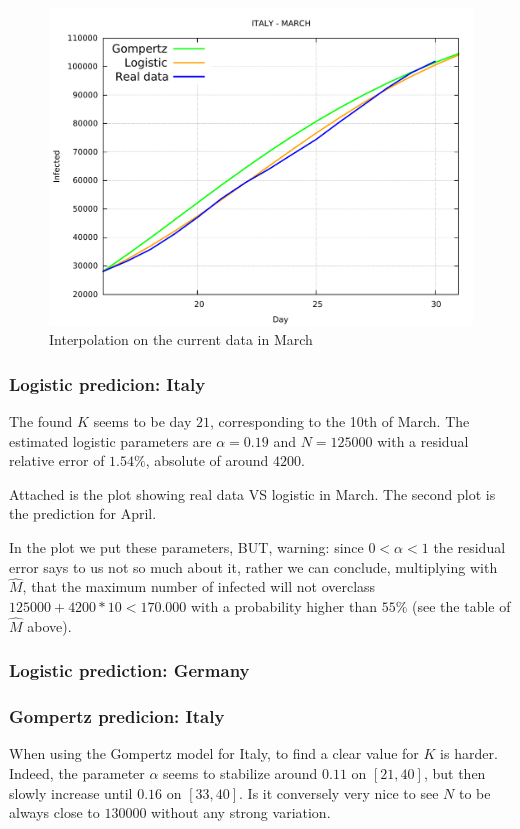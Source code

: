 \documentclass[6pt]{article}
\begin{document}
\begin{figure}
  \includegraphics[width=\linewidth]{plot_march_italy.pdf}
  \caption{Interpolation on the current data in March}
  \label{fig:boat1}
\end{figure}


\subsubsection{Logistic predicion: Italy}
The found $K$ seems to be day $21$, corresponding to the 10th of March.
The estimated logistic parameters are $\alpha = 0.19$ and $N = 125000$
with a residual relative error of $1.54\%$,
absolute of around $4200$.

Attached is the plot showing real data VS logistic in March.
The second plot is the prediction for April.

In the plot we put these parameters, BUT, warning:
since $0 < \alpha < 1$ the residual error says to us not so much about
it, rather we can conclude, multiplying with $\hat{M}$, that the
maximum number of infected will not overclass $125000 + 4200 * 10 < 170.000$
with a probability higher than $55\%$ (see the table of $\hat{M}$ above).

\subsubsection {Logistic prediction: Germany}



\subsubsection{Gompertz predicion: Italy}
When using the Gompertz model for Italy, to find a clear value for $K$ is
harder. Indeed, the parameter $\alpha$ seems to stabilize around $0.11$
on $[21,40]$, but then slowly increase until $0.16$ on $[33,40]$.
Is it conversely very nice to see $N$ to be always close to $130000$
without any strong variation. 
\end{document}
